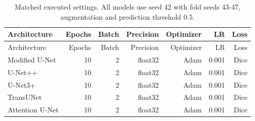 \small
\begin{longtable}{lrrrrrr}
\caption{Matched executed settings. All models use seed 42 with fold seeds 43-47, augmentation and prediction threshold 0.5.}\\
\toprule
Architecture & Epochs & Batch & Precision & Optimizer & LR & Loss\\\midrule
\endfirsthead
\toprule
Architecture & Epochs & Batch & Precision & Optimizer & LR & Loss\\\midrule
\endhead
Modified U-Net & 10 & 2 & float32 & Adam & 0.001 & Dice\\
U-Net++ & 10 & 2 & float32 & Adam & 0.001 & Dice\\
U-Net3+ & 10 & 2 & float32 & Adam & 0.001 & Dice\\
TransUNet & 10 & 2 & float32 & Adam & 0.001 & Dice\\
Attention U-Net & 10 & 2 & float32 & Adam & 0.001 & Dice\\
\bottomrule\end{longtable}\normalsize
